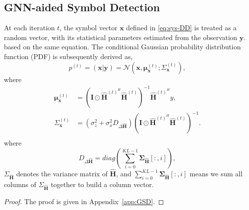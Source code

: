\documentclass[journal]{IEEEtran}
\begin{document}
\subsection{GNN-aided Symbol Detection}
At each iteration $t$, the symbol vector $\bm{x}$ defined in \eqref{eq:sys-DD} is treated as a random vector, with its statistical parameters estimated from the observation $\bm{y}$. based on the same equation. The conditional Gaussian probability distribution
function (PDF) is subsequently derived as,
\begin{equation}
p^{(t)}=(\bm{x}|\bm{y}) = \mathcal{N}(\bm{x}, \bm{\mu}_{\bm{x}}^{(t)}; \Sigma_{\bm{x}}^{(t)}),
\end{equation}
where
\begin{subequations}
\begin{align}
\bm{\mu}_{\bm{x}}^{(t)} &= (\bm I\odot\hat{\bm H}^{(t)^H} \hat{\bm H}^{(t)})^{-1}\hat{\bm H}^{(t)^H}y, \label{eq:GSD-mean} \\
\Sigma_{\bm{x}}^{(t)} &= (\sigma_z^2 + \sigma_x^2 D_{\Delta \hat{\bm H}})(\bm I\odot\hat{\bm H}^{(t)^H} \hat{\bm H}^{(t)})^{-1}. \label{eq:GSD-cov} \\
\end{align}
\end{subequations}
where
\begin{equation}
D_{\Delta \hat{\bm H}} = diag(\sum_{i=0}^{KL-1}\bm \Sigma_{\hat{\bm H}}[:, i]),
\end{equation}
$\Sigma_{\hat{\bm H}}$ denotes the variance matrix of $\hat{\bm H}$, and $\sum_{i=0}^{KL-1}\bm \Sigma_{\hat{\bm H}}[:, i]$ means we sum all columns of $\Sigma_{\hat{\bm H}}$ together to build a column vector.

\begin{proof}
The proof is given in Appendix~\ref{app:GSD}.
\end{proof}

\end{document}
